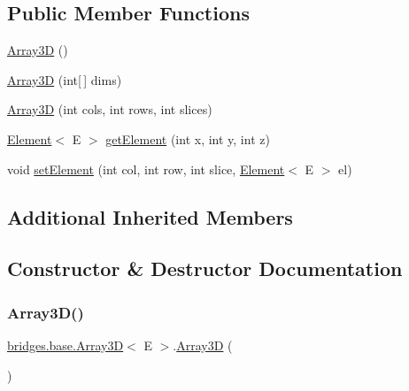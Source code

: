 \subsection*{Public Member Functions}
\begin{DoxyCompactItemize}
\item 
\hyperlink{classbridges_1_1base_1_1_array3_d_a789f7fa8829d308b2d196dbd5b3f912f}{Array3D} ()
\item 
\hyperlink{classbridges_1_1base_1_1_array3_d_a015b271607e8b2b9e1425255f229af1b}{Array3D} (int\mbox{[}$\,$\mbox{]} dims)
\item 
\hyperlink{classbridges_1_1base_1_1_array3_d_a0d7fc7fd13435f6a8fb55a716d57dd01}{Array3D} (int cols, int rows, int slices)
\item 
\hyperlink{classbridges_1_1base_1_1_element}{Element}$<$ E $>$ \hyperlink{classbridges_1_1base_1_1_array3_d_ace3434de6e5476e5db78a0e51e6362c9}{get\+Element} (int x, int y, int z)
\item 
void \hyperlink{classbridges_1_1base_1_1_array3_d_acdd758d0d5064cb978a9e193d19c1149}{set\+Element} (int col, int row, int slice, \hyperlink{classbridges_1_1base_1_1_element}{Element}$<$ E $>$ el)
\end{DoxyCompactItemize}
\subsection*{Additional Inherited Members}


\subsection{Constructor \& Destructor Documentation}
\mbox{\label{classbridges_1_1base_1_1_array3_d_a789f7fa8829d308b2d196dbd5b3f912f}} 
\subsubsection{\texorpdfstring{Array3\+D()}{Array3D()}\hspace{0.1cm}{\footnotesize\ttfamily [1/3]}}
{\footnotesize\ttfamily \hyperlink{classbridges_1_1base_1_1_array3_d}{bridges.\+base.\+Array3D}$<$ E $>$.\hyperlink{classbridges_1_1base_1_1_array3_d}{Array3D} (\begin{DoxyParamCaption}{ }\end{DoxyParamCaption})}

